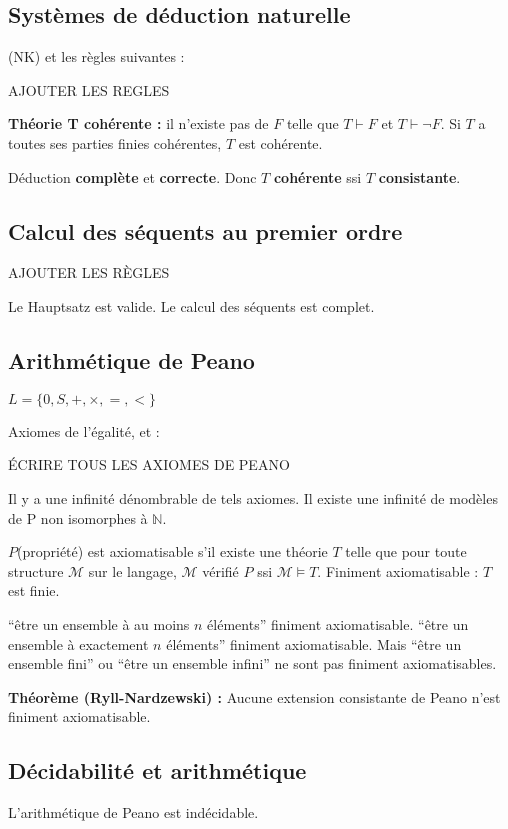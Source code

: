 \documentclass[french]{article}
\begin{document}
\subsection{Systèmes de déduction naturelle}
(NK) et les règles suivantes :

AJOUTER LES REGLES

\textbf{Théorie T cohérente : }il n'existe pas de $F$ telle que $T\vdash F$ et $T\vdash\neg F$. Si $T$ a toutes ses parties finies cohérentes, $T$ est cohérente.

Déduction \textbf{complète} et \textbf{correcte}. Donc $T$ \textbf{cohérente} ssi $T$ \textbf{consistante}.

\subsection{Calcul des séquents au premier ordre}
AJOUTER LES RÈGLES

Le Hauptsatz est valide. Le calcul des séquents est complet.

\subsection{Arithmétique de Peano}
$L = \{0,S,+,\times,=,<\}$

Axiomes de l'égalité, et :

ÉCRIRE TOUS LES AXIOMES DE PEANO

Il y a une infinité dénombrable de tels axiomes. Il existe une infinité de modèles de P non isomorphes à $\mathbb{N}$.

$P$(propriété) est axiomatisable s'il existe une théorie $T$ telle que pour toute structure $\mathcal{M}$ sur le langage, $\mathcal{M}$ vérifié $P$ ssi $\mathcal{M}\models T$. Finiment axiomatisable : $T$ est finie.

``être un ensemble à au moins $n$ éléments'' finiment axiomatisable.
``être un ensemble à exactement $n$ éléments'' finiment axiomatisable.
Mais ``être un ensemble fini'' ou ``être un ensemble infini'' ne sont pas finiment axiomatisables.

\textbf{Théorème (Ryll-Nardzewski) :} Aucune extension consistante de Peano n'est finiment axiomatisable.

\subsection{Décidabilité et arithmétique}
L'arithmétique de Peano est indécidable.
\end{document}
